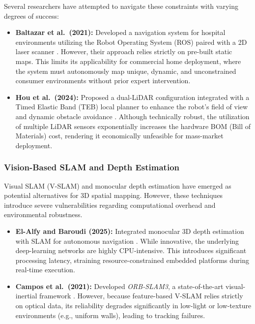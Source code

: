 \documentclass[12pt,a4paper]{report}
\begin{document}
Several researchers have attempted to navigate these constraints with varying degrees of success:
\begin{itemize}
    \item \textbf{Baltazar et al.\ (2021):} Developed a navigation system for hospital environments utilizing the Robot Operating System (ROS) paired with a 2D laser scanner \cite{baltazar_2021}. However, their approach relies strictly on pre-built static maps. This limits its applicability for commercial home deployment, where the system must autonomously map unique, dynamic, and unconstrained consumer environments without prior expert intervention.
    \item \textbf{Hou et al.\ (2024):} Proposed a dual-LiDAR configuration integrated with a Timed Elastic Band (TEB) local planner to enhance the robot's field of view and dynamic obstacle avoidance \cite{hou_2024}. Although technically robust, the utilization of multiple LiDAR sensors exponentially increases the hardware BOM (Bill of Materials) cost, rendering it economically unfeasible for mass-market deployment.
\end{itemize}

\subsubsection{Vision-Based SLAM and Depth Estimation}

Visual SLAM (V-SLAM) and monocular depth estimation have emerged as potential alternatives for 3D spatial mapping. However, these techniques introduce severe vulnerabilities regarding computational overhead and environmental robustness.

\begin{itemize}
    \item \textbf{El-Alfy and Baroudi (2025):} Integrated monocular 3D depth estimation with SLAM for autonomous navigation \cite{elalfy_monocular}. While innovative, the underlying deep-learning networks are highly CPU-intensive. This introduces significant processing latency, straining resource-constrained embedded platforms during real-time execution.
    \item \textbf{Campos et al.\ (2021):} Developed \textit{ORB-SLAM3}, a state-of-the-art visual-inertial framework \cite{orbslam3}. However, because feature-based V-SLAM relies strictly on optical data, its reliability degrades significantly in low-light or low-texture environments (e.g., uniform walls), leading to tracking failures.
\end{itemize}
\end{document}
